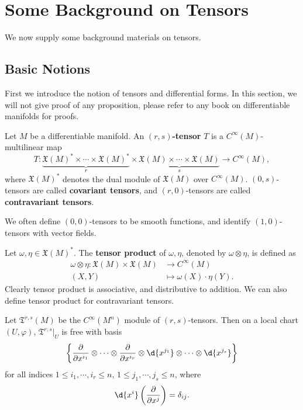 \chapter{Some Background on Tensors}
We now supply some background materials on tensors.


\section{Basic Notions}

First we introduce the notion of tensors and differential forms.
In this section, we will not give proof of any proposition, please refer to any book on differentiable manifolds for proofs.
\begin{defn}
    Let $M$ be a differentiable manifold.
    An \textbf{$(r,s)$-tensor} $T$ is a $C^\infty(M)$-multi\-linear map
    \[T:\underbrace{\mathfrak{X}(M)^*\times\cdots\times\mathfrak{X}(M)^*}_{r}\times\underbrace{\mathfrak{X}(M)\times\cdots\times\mathfrak{X}(M)}_{s}\to C^\infty(M),\]
    where $\mathfrak{X}(M)^*$ denotes the dual module of $\mathfrak{X}(M)$ over $C^\infty(M)$.
    $(0,s)$-tensors are called \textbf{covariant tensors}, and $(r,0)$-tensors are called \textbf{contravariant tensors}.
\end{defn}

\begin{rem}
    We often define $(0,0)$-tensors to be smooth functions, and identify $(1,0)$-tensors with vector fields.
\end{rem}

\begin{defn}
    Let $\omega,\eta\in\mathfrak{X}(M)^*$.
    The \textbf{tensor product} of $\omega,\eta$, denoted by $\omega\otimes\eta$, is defined as
    \begin{align*}
        \omega\otimes\eta:\mathfrak{X}(M)\times\mathfrak{X}(M)&\to C^\infty(M)\\
        (X,Y)&\mapsto\omega(X)\cdot\eta(Y).
    \end{align*}
    Clearly tensor product is associative, and distributive to addition.
    We can also define tensor product for contravariant tensors.
\end{defn}

\begin{prop}
    Let $\mathfrak{T}^{r,s}(M)$ be the $C^\infty(M^n)$ module of $(r,s)$-tensors.
    Then on a local chart $(U,\varphi)$, $\mathfrak{T}^{r,s}|_U$ is free with basis
    \[\left\{\frac{\partial{}}{\partial{x^{i_1}}}\otimes\cdots\otimes\frac{\partial{}}{\partial{x^{i_r}}}\otimes\d{x^{j_1}}\otimes\cdots\otimes\d{x^{j_s}}\right\}\]
    for all indices $1\leq i_1,\cdots,i_r\leq n$, $1\leq j_1,\cdots,j_s\leq n$, where
    \[\d{x^i}\left(\frac{\partial{}}{\partial{x^j}}\right)=\delta_{ij}.\]
\end{prop}

